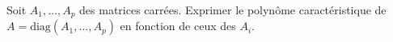 Soit $A_1,\dots,A_p$ des matrices carrées. Exprimer le polynôme caractéristique de $A = \mathrm{diag}(A_1,\dots,A_p)$ en fonction de ceux des $A_i$. 
